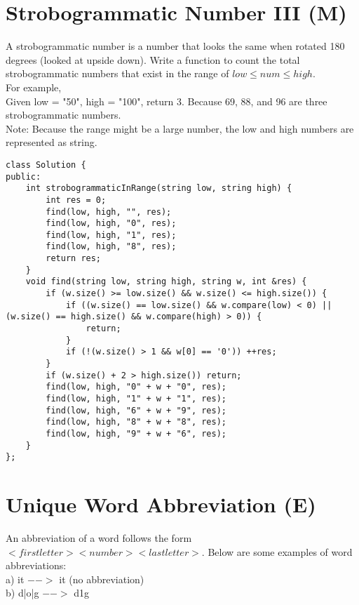 \section{Strobogrammatic Number III (M)}
A strobogrammatic number is a number that looks the same when rotated 180 degrees (looked at upside down). Write a function to count the total strobogrammatic numbers that exist in the range of $low \leq num \leq high$. \\

For example,\\
Given low = "50", high = "100", return 3. Because 69, 88, and 96 are three strobogrammatic numbers. \\

Note: Because the range might be a large number, the low and high numbers are represented as string.\\

\begin{lstlisting}
class Solution {
public:
    int strobogrammaticInRange(string low, string high) {
        int res = 0;
        find(low, high, "", res);
        find(low, high, "0", res);
        find(low, high, "1", res);
        find(low, high, "8", res);
        return res;
    }
    void find(string low, string high, string w, int &res) {
        if (w.size() >= low.size() && w.size() <= high.size()) {
            if ((w.size() == low.size() && w.compare(low) < 0) || (w.size() == high.size() && w.compare(high) > 0)) {
                return;
            }
            if (!(w.size() > 1 && w[0] == '0')) ++res;
        }
        if (w.size() + 2 > high.size()) return;
        find(low, high, "0" + w + "0", res);
        find(low, high, "1" + w + "1", res);
        find(low, high, "6" + w + "9", res);
        find(low, high, "8" + w + "8", res);
        find(low, high, "9" + w + "6", res);
    }
};
\end{lstlisting}


\section{Unique Word Abbreviation (E)}
An abbreviation of a word follows the form $<first letter><number><last letter>$. Below are some examples of word abbreviations:\\

a) it                     $ -->$ it    (no abbreviation)\\

b) d|o|g                   $-->$ d1g\\

